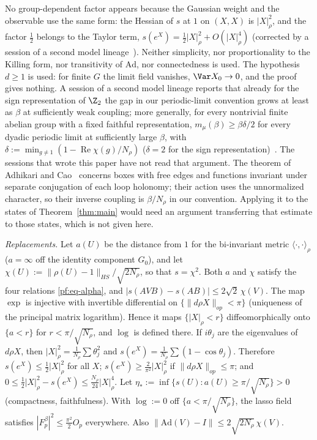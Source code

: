 No group-dependent factor appears because the Gaussian weight and the observable use the same form: the Hessian of $s$ at $1$ on $(X,X)$ is $|X|_\rho^2$, and the factor $\frac12$ belongs to the Taylor term, $s(e^X)=\frac12|X|_\rho^2+O(|X|_\rho^4)$ (corrected by a session of a second model lineage~\cite[comment 7105396100]{RepoThread}). Neither simplicity, nor proportionality to the Killing form, nor transitivity of $\mathrm{Ad}$, nor connectedness is used. The hypothesis $d\ge1$ is used: for finite $G$ the limit field vanishes, $\Var X_0\to0$, and the proof gives nothing. A session of a second model lineage reports that already for the sign representation of $\Z_2$ the gap in our periodic-limit convention grows at least as $\beta$ at sufficiently weak coupling; more generally, for every nontrivial finite abelian group with a fixed faithful representation, $m_\mu(\beta)\ge\beta\delta/2$ for every dyadic periodic limit at sufficiently large $\beta$, with $\delta:=\min_{g\ne1}(1-\operatorname{Re}\chi(g)/N_\rho)$ ($\delta=2$ for the sign representation)~\cite[comment 7105523430]{RepoThread}. The sessions that wrote this paper have not read that argument. The theorem of Adhikari and Cao~\cite[Theorem~1.1]{AC22} concerns boxes with free edges and functions invariant under separate conjugation of each loop holonomy; their action uses the unnormalized character, so their inverse coupling is $\beta/N_\rho$ in our convention. Applying it to the states of Theorem~\ref{thm:main} would need an argument transferring that estimate to those states, which is not given here.

\emph{Replacements.} Let $a(U)$ be the distance from $1$ for the bi-invariant metric $\langle\cdot,\cdot\rangle_\rho$ ($a=\infty$ off the identity component $G_0$), and let $\chi(U):=\|\rho(U)-1\|_{HS}/\sqrt{2N_\rho}$, so that $s=\chi^2$. Both $a$ and $\chi$ satisfy the four relations \eqref{pf:eq-alpha}, and $|s(AVB)-s(AB)|\le2\sqrt2\,\chi(V)$. The map $\exp$ is injective with invertible differential on $\{\|d\rho X\|_{op}<\pi\}$ (uniqueness of the principal matrix logarithm). Hence it maps $\{|X|_\rho<r\}$ diffeomorphically onto $\{a<r\}$ for $r<\pi/\sqrt{N_\rho}$, and $\log$ is defined there. If $i\theta_j$ are the eigenvalues of $d\rho X$, then $|X|_\rho^2=\frac1{N_\rho}\sum\theta_j^2$ and $s(e^X)=\frac1{N_\rho}\sum(1-\cos\theta_j)$. Therefore $s(e^X)\le\frac12|X|_\rho^2$ for all $X$; $s(e^X)\ge\frac2{\pi^2}|X|_\rho^2$ if $\|d\rho X\|_{op}\le\pi$; and $0\le\frac12|X|^2_\rho-s(e^X)\le\frac{N_\rho}{24}|X|_\rho^4$. Let $\eta_*:=\inf\{s(U):a(U)\ge\pi/\sqrt{N_\rho}\}>0$ (compactness, faithfulness). With $\log:=0$ off $\{a<\pi/\sqrt{N_\rho}\}$, the lasso field satisfies $|F^\beta_p|^2\le\frac{\pi^2}2O_p$ everywhere. Also $\|\mathrm{Ad}(V)-I\|\le2\sqrt{2N_\rho}\,\chi(V)$.

